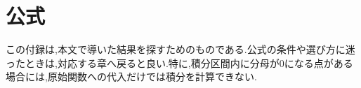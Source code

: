 \chapter{公式}\label{章:参照表}
この付録は,本文で導いた結果を探すためのものである.公式の条件や選び方に迷ったときは,対応する章へ戻ると良い.特に,積分区間内に分母が0になる点がある場合には,原始関数への代入だけでは積分を計算できない.

%
%
%
%
%
%

